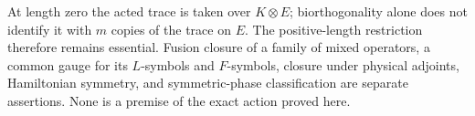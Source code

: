At length zero the acted trace is taken over $K\otimes E$;
biorthogonality alone does not identify it with $m$ copies of the trace
on $E$. The positive-length restriction therefore remains essential.
Fusion closure of a family of mixed operators, a common gauge for its
$L$-symbols and $F$-symbols, closure under physical adjoints,
Hamiltonian symmetry, and symmetric-phase classification are separate
assertions. None is a premise of the exact action proved here.

